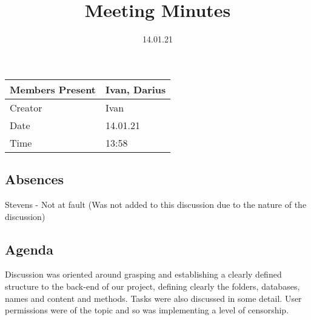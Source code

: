 \documentclass{article}
\title{Meeting Minutes}
\date{14.01.21}
\begin{document}
\maketitle

\begin{center}
    \begin{tabular}{ | l | p{14cm} |}
    \hline
    Members Present & Ivan, Darius \\ \hline
    Creator         & Ivan \\ \hline
    Date            & 14.01.21\\ \hline
    Time            & 13:58 \\ \hline
    \end{tabular}
\end{center}

\subsection{Absences}

Stevens - Not at fault (Was not added to this discussion due to the nature of the discussion) 

\subsection{Agenda}

Discussion was oriented around grasping and establishing a clearly defined structure to the back-end of our project, defining clearly the folders, databases, names and content and methods. Tasks were also discussed in some detail. User permissions were of the topic and so was implementing a level of censorship.
\end{document}
